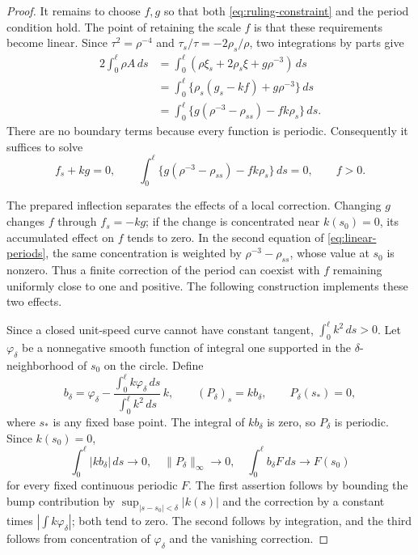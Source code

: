 \documentclass[11pt]{amsart}
\theoremstyle{definition}
\begin{document}
\begin{proof}
It remains to choose $f,g$ so that both
\eqref{eq:ruling-constraint} and the period condition hold.
The point of retaining the scale $f$ is that these requirements
become linear. Since $\tau^2=\rho^{-4}$ and
$\tau_s/\tau=-2\rho_s/\rho$, two integrations by parts give
\begin{equation}\label{eq:period-identity}
 \begin{aligned}
 2\int_0^\ell\rho A\,ds
 &=\int_0^\ell(\rho\xi_s+2\rho_s\xi+g\rho^{-3})\,ds\\
 &=\int_0^\ell\{\rho_s(g_s-kf)+g\rho^{-3}\}\,ds\\
 &=\int_0^\ell\{g(\rho^{-3}-\rho_{ss})-fk\rho_s\}\,ds .
 \end{aligned}
\end{equation}
There are no boundary terms because every function is periodic.
Consequently it suffices to solve
\begin{equation}\label{eq:linear-periods}
 f_s+kg=0,\qquad
 \int_0^\ell\{g(\rho^{-3}-\rho_{ss})-fk\rho_s\}\,ds=0,
 \qquad f>0.
\end{equation}

The prepared inflection separates the effects of a local correction.
Changing $g$ changes $f$ through $f_s=-kg$; if the change is
concentrated near $k(s_0)=0$, its accumulated effect on $f$
tends to zero. In the second equation of
\eqref{eq:linear-periods}, the same concentration is weighted
by $\rho^{-3}-\rho_{ss}$, whose value at $s_0$ is nonzero.
Thus a finite correction of the period can coexist with $f$
remaining uniformly close to one and positive.
The following construction implements these two effects.

Since a closed unit-speed curve
cannot have constant tangent, $\int_0^\ell k^2\,ds>0$.
Let $\varphi_\delta$ be a nonnegative smooth function of integral
one supported in the $\delta$-neighborhood of $s_0$ on the circle.
Define
\[
 b_\delta=\varphi_\delta-
       \frac{\int_0^\ell k\varphi_\delta\,ds}
            {\int_0^\ell k^2\,ds}\,k,\qquad
 (P_\delta)_s=kb_\delta,\qquad P_\delta(s_*)=0,
\]
where $s_*$ is any fixed base point.
The integral of $kb_\delta$ is zero, so $P_\delta$ is periodic.
Since $k(s_0)=0$,
\[
 \int_0^\ell|kb_\delta|\,ds\longrightarrow0,\quad
 \|P_\delta\|_\infty\longrightarrow0,\quad
 \int_0^\ell b_\delta F\,ds\longrightarrow F(s_0)
\]
for every fixed continuous periodic $F$.
The first assertion follows by bounding the bump contribution by
$\sup_{|s-s_0|<\delta}|k(s)|$ and the correction by a constant
times $|\int k\varphi_\delta|$; both tend to zero.
The second follows by integration, and the third follows from
concentration of $\varphi_\delta$ and the vanishing correction.


\end{proof}
\end{document}
